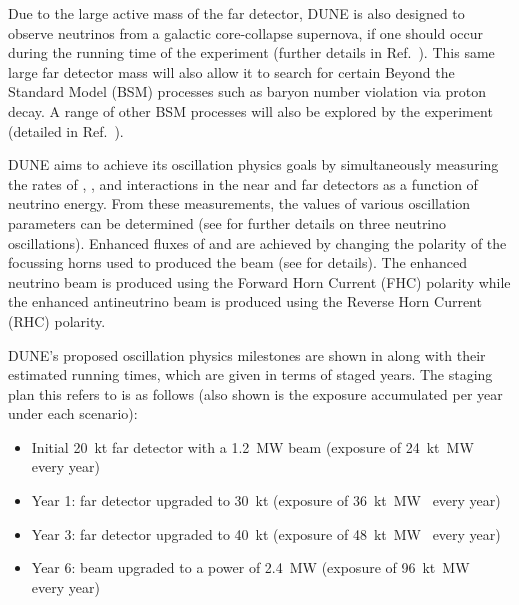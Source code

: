 Due to the large active mass of the far detector, DUNE is also designed to observe neutrinos from a galactic core-collapse supernova, if one should occur during the running time of the experiment (further details in Ref.~\cite{duneSupernova}).
This same large far detector mass will also allow it to search for certain Beyond the Standard Model (BSM) processes such as baryon number violation via proton decay.
A range of other BSM processes will also be explored by the experiment (detailed in Ref.~\cite{duneBSM}).

DUNE aims to achieve its oscillation physics goals by simultaneously measuring the rates of \numu, \anumu, \nue and \anue interactions in the near and far detectors as a function of neutrino energy.
From these measurements, the values of various oscillation parameters can be determined (see  for further details on three neutrino oscillations). 
Enhanced fluxes of \anumu and \anue are achieved by changing the polarity of the focussing horns used to produced the beam (see  for details).
The enhanced neutrino beam is produced using the Forward Horn Current (FHC) polarity while the enhanced antineutrino beam is produced using the Reverse Horn Current (RHC) polarity.

DUNE's proposed oscillation physics milestones are shown in  along with their estimated running times, which are given in terms of staged years. 
The staging plan this refers to is as follows (also shown is the exposure accumulated per year under each scenario):
\begin{itemize}
	\item Initial \SI{20}{\kilo\tonne} far detector with a \SI{1.2}{\mega\watt} beam (exposure of \SI{24}{\kilo\tonne\mega\watt\year} every year)
	\item Year 1: far detector upgraded to \SI{30}{\kilo\tonne} (exposure of \SI{36}{\kilo\tonne\mega\watt\year} every year)
	\item Year 3: far detector upgraded to \SI{40}{\kilo\tonne} (exposure of \SI{48}{\kilo\tonne\mega\watt\year} every year)
	\item Year 6: beam upgraded to a power of \SI{2.4}{\mega\watt} (exposure of \SI{96}{\kilo\tonne\mega\watt\year} every year)
\end{itemize}

